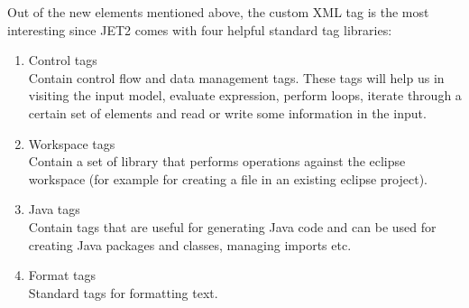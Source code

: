 Out of the new elements mentioned above, the custom XML tag is the most interesting since JET2 comes with four helpful standard tag libraries\cite{JET2TAGS}:
\begin{enumerate}
	\item Control tags\\
		    Contain control flow and data management tags. These tags will help us in visiting the input model, evaluate expression, perform loops,  iterate through a certain set of elements and read or write some information in the input. 
	\item Workspace tags\\
			  Contain a set of library that performs operations against the eclipse workspace (for example for creating a file in an existing eclipse project). 
	\item Java tags\\
				Contain tags that are useful for generating Java code and can be used for creating Java packages and classes, managing imports etc.
	\item Format tags\\
		    Standard tags for formatting text. 
\end{enumerate}

